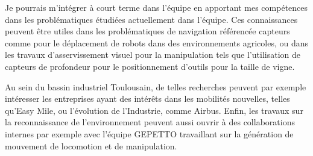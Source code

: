 Je pourrais m'intégrer à court terme dans l'équipe en apportant mes compétences dans les problématiques étudiées actuellement dans l'équipe. Ces connaissances peuvent être utiles dans les problématiques de navigation référencée capteurs comme pour le déplacement de robots dans des environnements agricoles, ou dans les travaux d'asservissement visuel pour la manipulation tels que l'utilisation de capteurs de profondeur pour le positionnement d'outils pour la taille de vigne.

Au sein du bassin industriel Toulousain, de telles recherches peuvent par exemple intéresser les entreprises ayant des intérêts dans les mobilités nouvelles, telles qu'Easy Mile, ou l'évolution de l'Industrie, comme Airbus. Enfin, les travaux sur la reconnaissance de l'environnement peuvent aussi ouvrir à des collaborations internes par exemple avec l'équipe GEPETTO travaillant sur la génération de mouvement de locomotion et de manipulation.
